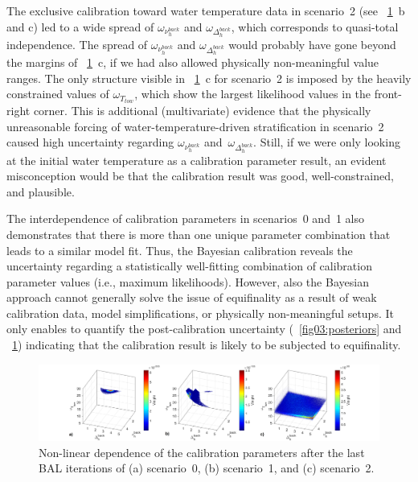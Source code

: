 \documentclass[draft,linenumbers,onecolumn]{agujournal2019} %
\begin{document}
The exclusive calibration toward water temperature data in scenario~2 (see \figurename{~\ref{fig04:interdependence}}~b and c) led to a wide spread of $\omega_{\nu_{h}^{back}}$ and $\omega_{\Delta_{h}^{back}}$, which corresponds to quasi-total independence. The spread of $\omega_{\nu_{h}^{back}}$ and $\omega_{\Delta_{h}^{back}}$ would probably have gone beyond the margins of \figurename{~\ref{fig04:interdependence}}~c, if we had also allowed physically non-meaningful value ranges. The only structure visible in \figurename{~\ref{fig04:interdependence}}~c for scenario~2 is imposed by the heavily constrained values of $\omega_{T_{tow}}$, which show the largest likelihood values in the front-right corner. This is additional (multivariate) evidence that the physically unreasonable forcing of water-temperature-driven stratification in scenario~2 caused high uncertainty regarding $\omega_{\nu_{h}^{back}}$ and~$\omega_{\Delta_{h}^{back}}$. Still, if we were only looking at the initial water temperature as a calibration parameter result, an evident misconception would be that the calibration result was good, well-constrained, and plausible.

The interdependence of calibration parameters in scenarios~0 and~1 also demonstrates that there is more than one unique parameter combination that leads to a similar model fit. Thus, the Bayesian calibration reveals the uncertainty regarding a statistically well-fitting combination of calibration parameter values (i.e., maximum likelihoods). However, also the Bayesian approach cannot generally solve the issue of equifinality as a result of weak calibration data, model simplifications, or physically non-meaningful setups. It only enables to quantify the post-calibration uncertainty (\figurename{~\ref{fig03:posteriors}} and \figurename{~\ref{fig04:interdependence}}) indicating that the calibration result is likely to be subjected to equifinality.


\begin{figure}
	\centering
	\includegraphics[width=14.5cm]{interdependence.png} %
	\caption{Non-linear dependence of the calibration parameters after the last BAL iterations of (a) scenario~0,  (b) scenario~1, and (c) scenario~2.}
	\label{fig04:interdependence}
\end{figure}
\end{document}
